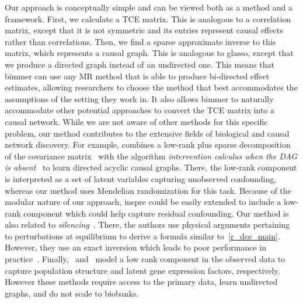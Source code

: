 \documentclass{article}
\begin{document}
Our approach is conceptually simple and can be viewed both as a method and a framework.
First, we calculate a TCE matrix.
This is analogous to a correlation matrix, except that it is not symmetric and its entries
represent causal effects rather than correlations. Then, we find a sparse approximate inverse
to this matrix, which represents a causal graph.
This is analogous to glasso, except that we produce a directed graph instead
of an undirected one. This means that bimmer can use any MR method
that is able to produce bi-directed effect estimates,
allowing researchers to choose the method that best accommodates the assumptions of
the setting they work in. It also allows bimmer to naturally accommodate other potential
approaches to convert the TCE matrix into a causal network.
While we are not aware of other methods for this specific problem, our method contributes to the
extensive fields of biological and causal network discovery.
For example, \cite{Frot2019a} combines a low-rank plus sparse decomposition
of the covariance matrix~\cite{Frot2019b,Chandrasekaran2012} with
the algorithm \emph{intervention calculus when the
DAG is absent}~\cite{Maathuis2009} to learn directed acyclic causal graphs. There, the low-rank
component is interpreted as a set of latent variables capturing unobserved confounding, whereas
our method uses Mendelian randomization for this task.
Because of the modular nature of our approach, inspre could be easily
extended to include a low-rank component which could help capture residual confounding.
Our method is also related to \emph{silencing}~\cite{Barzel2013}. There,
the authors use physical arguments pertaining to perturbations at equilibrium to derive
a formula similar to~\eqref{r_dce_main}. However, they use an exact inversion which
leads to poor performance in practice~\cite{Pachter}. Finally,~\cite{Dahl2013} and~\cite{Stegle2011}
model a low rank component in the observed data to capture population structure and latent
gene expression factors, respectively. However these methods require access to the primary data,
learn undirected graphs, and do not scale to biobanks.
\end{document}
